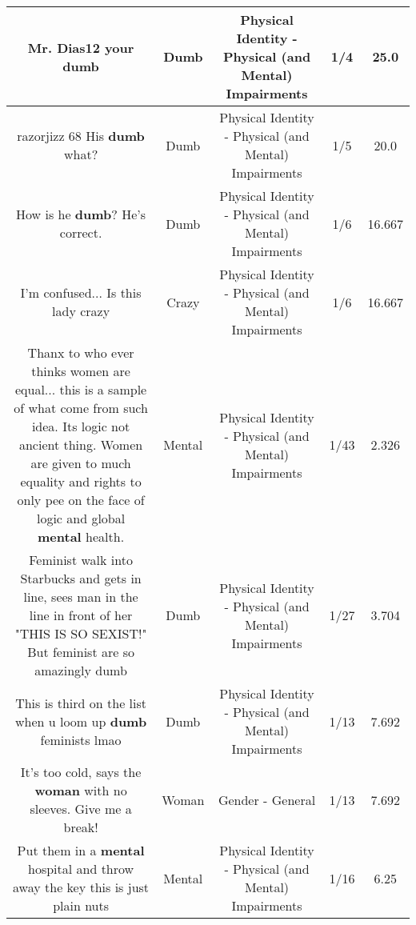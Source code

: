 \documentclass[11pt]{article}
\newlength\mylength
\begin{document}
\begin{center}
\begin{longtable}{|C{.65\mylength}|C{.30\mylength}|C{.12\mylength}|C{.12\mylength}|C{.12\mylength}|}
  \small Mr. Dias12 your dumb\normalsize   & Dumb & Physical Identity - Physical (and Mental) Impairments & 1/4 & 25.0 \\  \hline
  \small razorjizz 68 His \textbf{dumb} what?\normalsize   & Dumb & Physical Identity - Physical (and Mental) Impairments & 1/5 & 20.0 \\  \hline
  \small How is he \textbf{dumb}? He's correct.\normalsize   & Dumb & Physical Identity - Physical (and Mental) Impairments & 1/6 & 16.667 \\  \hline
  \small I'm confused... Is this lady crazy\normalsize   & Crazy & Physical Identity - Physical (and Mental) Impairments & 1/6 & 16.667 \\  \hline
  \small Thanx to who ever thinks women are equal... this is a sample of what come from such idea. Its logic not ancient thing. Women are given to much equality and rights to only pee on the face of logic and global \textbf{mental} health.\normalsize   & Mental & Physical Identity - Physical (and Mental) Impairments & 1/43 & 2.326 \\  \hline
  \small Feminist walk into Starbucks and gets in line, sees man in the line in front of her "THIS IS SO SEXIST!" But feminist are so amazingly dumb\normalsize   & Dumb & Physical Identity - Physical (and Mental) Impairments & 1/27 & 3.704 \\  \hline
  \small This is third on the list when u loom up \textbf{dumb} feminists lmao\normalsize   & Dumb & Physical Identity - Physical (and Mental) Impairments & 1/13 & 7.692 \\  \hline
  \small It's too cold, says the \textbf{woman} with no sleeves. Give me a break!\normalsize   & Woman & Gender - General & 1/13 & 7.692 \\  \hline
  \small Put them in a \textbf{mental} hospital and throw away the key this is just plain nuts\normalsize   & Mental & Physical Identity - Physical (and Mental) Impairments & 1/16 & 6.25 \\  \hline

\end{longtable}
\end{center}
\end{document}
